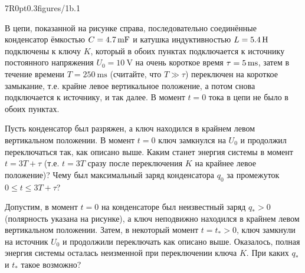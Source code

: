
\pic7R{0pt}{0.3}{figures/1b.1}

В цепи, показанной на рисунке справа, последовательно соединённые конденсатор ёмкостью $C=\qty{4.7}{\mF}$ и катушка индуктивностью $L=\qty{5.4}{\H}$ подключены к ключу $K$, который в обоих пунктах подключается к источнику постоянного напряжения $U_0=\qty{10}{\V}$ на очень короткое время $\tau=\qty5{\ms}$, затем в течение времени $T=\qty{250}{\ms}$ (считайте, что $T\gg\tau$) переключен на короткое замыкание, т.е. крайне левое вертикальное положение, а потом снова подключается к источнику, и так далее. В момент $t=0$ тока в цепи не было в обоих пунктах.

\begin{task}[type=subproblem]
    \item Пусть конденсатор был разряжен, а ключ находился в крайнем левом вертикальном положении. В момент $t=0$ ключ замкнулся на $U_0$ и продолжил переключаться так, как описано выше. Каким станет энергия системы в момент $t=3T+\tau$ (т.е. $t=3T$ сразу после переключения $K$ на крайнее левое положение)? Чему был максимальный заряд конденсатора $q_0$ за промежуток $0\leq t \leq 3T+\tau$?
    \item Допустим, в момент $t=0$ на конденсаторе был неизвестный заряд $q_*>0$ (полярность указана на рисунке), а ключ неподвижно находился в крайнем левом вертикальном положении. Затем, в некоторый момент $t=t_*>0$, ключ замкнули на источник $U_0$ и продолжили переключать как описано выше. Оказалось, полная энергия системы осталась неизменной при переключении ключа $K$. При каких $q_*$ и $t_*$ такое возможно?
\end{task}
